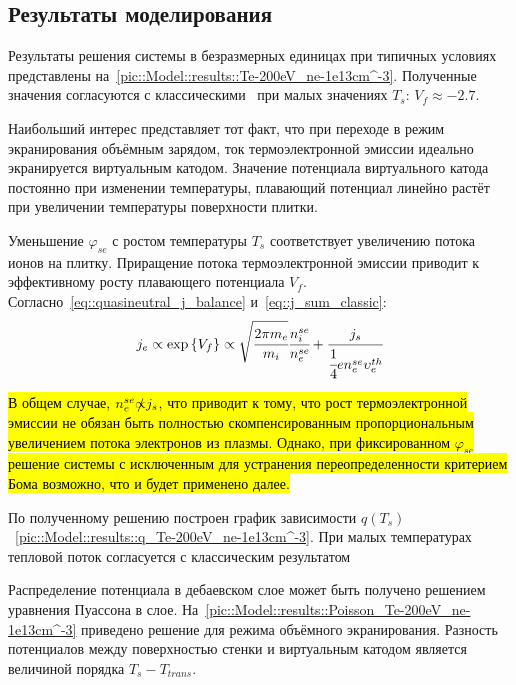 \subsection{Результаты моделирования}
Результаты решения системы в безразмерных единицах при типичных условиях представлены на~\autoref{pic::Model::results::Te-200eV_ne-1e13cm^-3}. 
Полученные значения согласуются с классическими~\cite{hobbs1967heat} при малых значениях $T_s$: $V_f \approx -2.7$.

Наибольший интерес представляет тот факт, что при переходе в режим экранирования объёмным зарядом, ток термоэлектронной эмиссии 
идеально экранируется виртуальным катодом. Значение потенциала виртуального катода постоянно при изменении температуры, 
плавающий потенциал линейно растёт при увеличении температуры поверхности плитки.

Уменьшение $\varphi_{se}$ с ростом температуры $T_s$ соответствует увеличению потока ионов на плитку. Приращение потока термоэлектронной эмиссии 
приводит к эффективному росту плавающего потенциала $V_f$. Согласно~\eqref{eq::quasineutral_j_balance} и~\eqref{eq::j_sum_classic}:
\begin{equation}
    j_e \propto \exp{\left\{{V_f}\right\}} \propto \sqrt{\cfrac{2\pi m_e}{m_i}}\cfrac{n_i^{se}}{n_e^{se}} + \cfrac{j_s}{\cfrac{1}{4}en_e^{se}\upsilon_e^{th}} 
\end{equation}

\hl{В общем случае, $n_e^{se} \slashed{\propto} j_s$, что приводит к тому, что рост термоэлектронной эмиссии не обязан быть полностью скомпенсированным 
пропорциональным увеличением потока электронов из плазмы. Однако, при фиксированном $\varphi_{se}$ решение системы с исключенным для устранения 
переопределенности критерием Бома возможно, что и будет применено далее.}

По полученному решению построен график зависимости $q(T_s)$~\autoref{pic::Model::results::q_Te-200eV_ne-1e13cm^-3}. При малых температурах тепловой поток 
согласуется с классическим результатом~\cite{stangeby2000plasma}

Распределение потенциала в дебаевском слое может быть получено решением уравнения Пуассона в слое. 
На~\autoref{pic::Model::results::Poisson_Te-200eV_ne-1e13cm^-3} приведено решение для режима объёмного экранирования. Разность потенциалов 
между поверхностью стенки и виртуальным катодом является величиной порядка $T_s - T_{trans}$.

